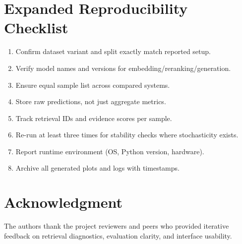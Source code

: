 \documentclass[10pt,draftclsnofoot,onecolumn,journal]{IEEEtran}
\begin{document}
\section{Expanded Reproducibility Checklist}
\begin{enumerate}
\item Confirm dataset variant and split exactly match reported setup.
\item Verify model names and versions for embedding/reranking/generation.
\item Ensure equal sample list across compared systems.
\item Store raw predictions, not just aggregate metrics.
\item Track retrieval IDs and evidence scores per sample.
\item Re-run at least three times for stability checks where stochasticity exists.
\item Report runtime environment (OS, Python version, hardware).
\item Archive all generated plots and logs with timestamps.
\end{enumerate}

\section*{Acknowledgment}
The authors thank the project reviewers and peers who provided iterative feedback on retrieval diagnostics, evaluation clarity, and interface usability.



\end{document}

